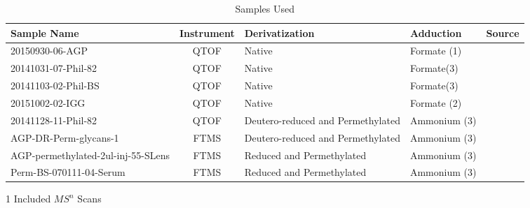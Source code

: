     \begin{table}
        \caption{Samples Used}\label{tab:sample_overview}
        \small
        \centering
        \begin{threeparttable}
        \begin{tabular}{p{4.1cm} | c | p{3cm} | p{3cm} | c}
            \toprule
            Sample Name & Instrument & Derivatization & Adduction & Source\\
            \midrule
            20150930-06-AGP & QTOF & Native & Formate (1) & \cite{Khatri2016a}\\
            20141031-07-Phil-82 & QTOF & Native & Formate(3) & \cite{Khatri2016a}\\
            20141103-02-Phil-BS & QTOF & Native & Formate(3) & \cite{Khatri2016a}\\
            20151002-02-IGG & QTOF & Native & Formate (2) & \cite{Khatri2016b}\\
            20141128-11-Phil-82\tnote{1} & QTOF &
                Deutero-reduced and Permethylated & Ammonium (3) & \cite{Khatri2016a}\\
            AGP-DR-Perm-glycans-1\tnote{1} & FTMS &
                Deutero-reduced and Permethylated & Ammonium (3) & \cite{Khatri2016a}\\
            AGP-permethylated-2ul-inj-55-SLens\tnote{1} & FTMS &
                Reduced and Permethylated & Ammonium (3) & \cite{Khatri2016a}\\
            Perm-BS-070111-04-Serum\tnote{1} & FTMS &
                Reduced and Permethylated & Ammonium (3) & \cite{Yu2013,Hu2012}\\
        \end{tabular}
        \begin{tablenotes}
            \item[1] Included $MS^n$ Scans
        \end{tablenotes}
        \end{threeparttable}
    \end{table}
